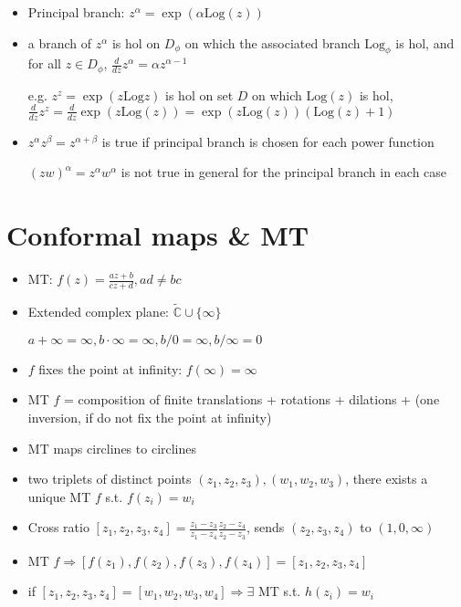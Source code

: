 \documentclass[10pt,a4paper]{article}
\begin{document}
\begin{multicols}{2}
\begin{itemize}
  \item Principal branch: $z^\alpha=\exp(\alpha \text{Log}(z))$
  
  \item a branch of $z^\alpha$ is hol on $D_\phi$ on which the associated branch $\text{Log}_\phi$ is hol, and for all $z\in D_\phi$, $\frac{d}{dz}z^\alpha = \alpha z^{\alpha-1}$
  
    e.g. $z^z=\exp(z\text{Log}{z})$ is hol on set $D$ on which $\text{Log}(z)$ is hol, $\frac{d}{dz}z^z =  \frac{d}{dz}\exp (z\text{Log}(z))=\exp(z\text{Log}(z))(\text{Log}(z)+1)$
  
  \item $z^\alpha z^\beta = z^{\alpha+\beta}$ is true if principal branch is chosen for each power function
  
    $(zw)^\alpha = z^\alpha w^\alpha$ is not true in general for the principal branch in each case 
\end{itemize}

\section{Conformal maps \& MT}

\begin{itemize}
    \item MT: $\displaystyle f(z)=\frac{az+b}{cz+d}, ad \neq bc$
    \item Extended complex plane: $\tilde{\mathbb C} \cup \{ \infty \}$
      
      $a+\infty=\infty, b \cdot \infty=\infty, b/0=\infty, b/\infty=0$
    \item $f$ fixes the point at infinity: $f(\infty)=\infty$
    \item MT $f$ = composition of finite translations + rotations + dilations + (one inversion, if do not fix the point at infinity)
    \item MT maps circlines to circlines
    \item two triplets of distinct points $(z_1,z_2,z_3), (w_1,w_2,w_3)$, there exists a unique MT $f$ s.t. $f(z_i)=w_i$
    \item Cross ratio $\displaystyle [z_1,z_2,z_3,z_4]=\frac{z_1-z_3}{z_1-z_4} \frac{z_2-z_4}{z_2-z_3}$, sends $(z_2,z_3,z_4)$ to $(1,0,\infty)$
    \item MT $f \Rightarrow [f(z_1),f(z_2),f(z_3),f(z_4)]=[z_1,z_2,z_3,z_4]$
    \item if $[z_1,z_2,z_3,z_4]=[w_1,w_2,w_3,w_4] \Rightarrow \exists$ MT s.t. $h(z_i)=w_i$
\end{itemize}


\end{multicols}
\end{document}

